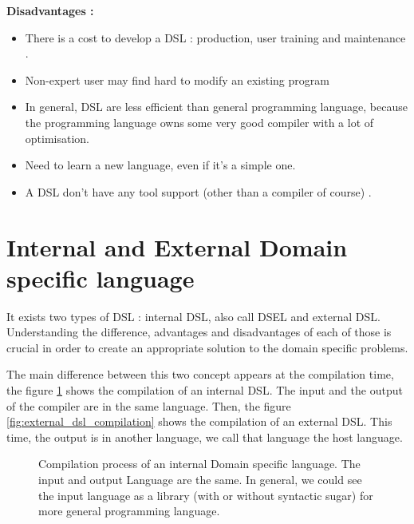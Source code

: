 \textbf{Disadvantages \cite{VanDeursen2000}:}
\begin{itemize}
\item There is a cost to develop a DSL : production, user training and
  maintenance .
\item Non-expert user may find hard to modify an existing program
\item In general, DSL are less efficient than general programming language,
  because the programming language owns some very good compiler with a lot of
  optimisation.
\item Need to learn a new language, even if it’s a simple one.
\item A DSL don’t have any tool support (other than a compiler of course) \cite{Mernik2005}.
\end{itemize}

\section{Internal and External Domain specific language}
\label{sec:internal_and_external_dsl}

It exists two types of \gls{DSL} : internal \gls{DSL}, also call \gls{DSEL} and
external DSL. Understanding the difference, advantages and disadvantages of each
of those is crucial in order to create an appropriate solution to the domain
specific problems.

The main difference between this two concept appears at the compilation time,
the figure \ref{fig:internal_dsl_compilation} shows the compilation of an
internal DSL. The input and the output of the compiler are in the same language.
Then, the figure \ref{fig:external_dsl_compilation} shows the compilation of an
external DSL. This time, the output is in another language, we call that
language the host language.

\begin{figure}[ht]
  \centering
  \caption[Compilation process of an internal \gls{DSL}]{Compilation process of
    an internal Domain specific language. The input and output Language are the
    same. In general, we could see the input language as a library (with or
    without syntactic sugar) for more general programming language.}
  \label{fig:internal_dsl_compilation}
\end{figure}

